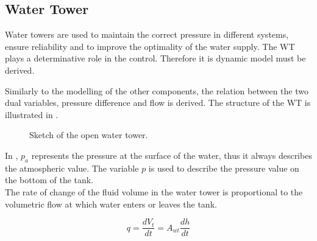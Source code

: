 \subsection{Water Tower} 
\label{WaterTankModel}

Water towers are used to maintain the correct pressure in different systems, ensure reliability and to improve the optimality of the water supply. The WT plays a determinative role in the control. Therefore it is dynamic model must be derived. 

Similarly to the modelling of the other components, the relation between the two dual variables, pressure difference and flow is derived. The structure of the WT is illustrated in .


\begin{figure}[H]
\centering
 
\caption{Sketch of the open water tower.}
\label{fig:watertower_sketch}
\end{figure}

In , $p_a$ represents the pressure at the surface of the water, thus it always describes the atmospheric value. The variable $p$ is used to describe the pressure value on the bottom of the tank. \\
The rate of change of the fluid volume in the water tower is proportional to the volumetric flow at which water enters or leaves the tank. 

\begin{equation}
  q = \frac{dV_t}{dt} = A_{wt} \frac{dh}{dt}
  \label{Flowequation}
\end{equation}

